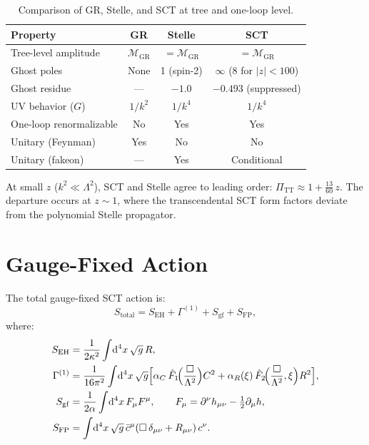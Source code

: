 \documentclass[11pt,a4paper]{article}
\theoremstyle{definition}
\theoremstyle{remark}
\newcommand{\dd}{\mathrm{d}}
\begin{document}
\begin{table}[H]
\centering
\caption{Comparison of GR, Stelle, and SCT at tree and one-loop level.}
\begin{tabular}{@{}lccc@{}}
\toprule
Property & GR & Stelle & SCT \\
\midrule
Tree-level amplitude & $\mathcal{M}_{\mathrm{GR}}$ & $= \mathcal{M}_{\mathrm{GR}}$ & $= \mathcal{M}_{\mathrm{GR}}$ \\
Ghost poles & None & 1 (spin-2) & $\infty$ (8 for $|z|<100$) \\
Ghost residue & --- & $-1.0$ & $-0.493$ (suppressed) \\
UV behavior ($G$) & $1/k^2$ & $1/k^4$ & $1/k^4$ \\
One-loop renormalizable & No & Yes & Yes \\
Unitary (Feynman) & Yes & No & No \\
Unitary (fakeon) & --- & Yes & Conditional \\
\bottomrule
\end{tabular}
\end{table}

At small $z$ ($k^2 \ll \Lambda^2$), SCT and Stelle agree to leading order:
$\Pi_{\mathrm{TT}} \approx 1 + \tfrac{13}{60}\, z$. The departure occurs
at $z \sim 1$, where the transcendental SCT form factors deviate from the
polynomial Stelle propagator.

\section{Gauge-Fixed Action}
\label{sec:gauge}

The total gauge-fixed SCT action is:
\begin{equation}
  S_{\mathrm{total}} = S_{\mathrm{EH}} + \Gamma^{(1)} + S_{\mathrm{gf}} + S_{\mathrm{FP}},
\end{equation}
where:
\begin{align}
  S_{\mathrm{EH}} &= \frac{1}{2\kappa^2}\int\!\dd^4x\,\sqrt{g}\, R, \\
  \Gamma^{(1)} &= \frac{1}{16\pi^2}\int\!\dd^4x\,\sqrt{g}\Bigl[
    \alpha_C\, \hat{F}_1\!\Bigl(\frac{\Box}{\Lambda^2}\Bigr) C^2
    + \alpha_R(\xi)\, \hat{F}_2\!\Bigl(\frac{\Box}{\Lambda^2},\xi\Bigr) R^2\Bigr], \\
  S_{\mathrm{gf}} &= \frac{1}{2\alpha}\int\!\dd^4x\, F_\mu F^\mu,
    \qquad F_\mu = \partial^\nu h_{\mu\nu} - \tfrac{1}{2}\partial_\mu h, \\
  S_{\mathrm{FP}} &= \int\!\dd^4x\,\sqrt{g}\, \bar{c}^\mu
    (\Box\,\delta_{\mu\nu} + R_{\mu\nu})\, c^\nu.
\end{align}
\end{document}
